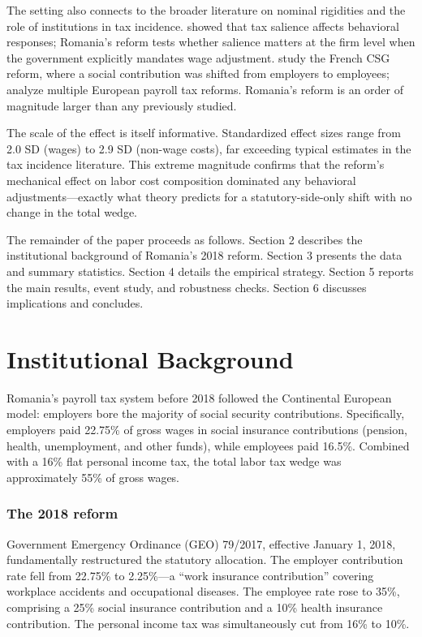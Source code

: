 \documentclass[12pt]{article}
\begin{document}
The setting also connects to the broader literature on nominal rigidities and the role of institutions in tax incidence. \citet{chetty2009salience} showed that tax salience affects behavioral responses; Romania's reform tests whether salience matters at the firm level when the government explicitly mandates wage adjustment. \citet{lehmann2013taxation} study the French CSG reform, where a social contribution was shifted from employers to employees; \citet{adam2019taxing} analyze multiple European payroll tax reforms. Romania's reform is an order of magnitude larger than any previously studied.

The scale of the effect is itself informative. Standardized effect sizes range from 2.0 SD (wages) to 2.9 SD (non-wage costs), far exceeding typical estimates in the tax incidence literature. This extreme magnitude confirms that the reform's mechanical effect on labor cost composition dominated any behavioral adjustments---exactly what theory predicts for a statutory-side-only shift with no change in the total wedge.

The remainder of the paper proceeds as follows. Section 2 describes the institutional background of Romania's 2018 reform. Section 3 presents the data and summary statistics. Section 4 details the empirical strategy. Section 5 reports the main results, event study, and robustness checks. Section 6 discusses implications and concludes.


\section{Institutional Background}

Romania's payroll tax system before 2018 followed the Continental European model: employers bore the majority of social security contributions. Specifically, employers paid 22.75\% of gross wages in social insurance contributions (pension, health, unemployment, and other funds), while employees paid 16.5\%. Combined with a 16\% flat personal income tax, the total labor tax wedge was approximately 55\% of gross wages.

\subsubsection*{The 2018 reform} Government Emergency Ordinance (GEO) 79/2017, effective January 1, 2018, fundamentally restructured the statutory allocation. The employer contribution rate fell from 22.75\% to 2.25\%---a ``work insurance contribution'' covering workplace accidents and occupational diseases. The employee rate rose to 35\%, comprising a 25\% social insurance contribution and a 10\% health insurance contribution. The personal income tax was simultaneously cut from 16\% to 10\%.
\end{document}
